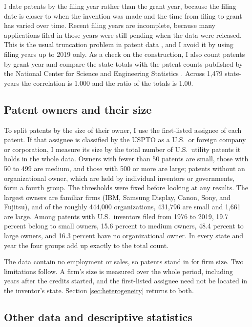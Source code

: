\documentclass[12pt]{article}
\begin{document}
I date patents by the filing year rather than the grant year, because the filing date is closer to when the
invention was made and the time from filing to grant has varied over time. Recent filing years are incomplete,
because many applications filed in those years were still pending when the data were released. This is the
usual truncation problem in patent data \citep{hall2001nber}, and I avoid it by using filing years up to 2019
only. As a check on the construction, I also count patents by grant year and compare the state totals with
the patent counts published by the National Center for Science and Engineering Statistics
\citep{ncses2026state}. Across 1,479 state-years the correlation is 1.000 and the ratio of the totals is 1.00.

\subsection{Patent owners and their size}

To split patents by the size of their owner, I use the first-listed assignee of each patent. If that assignee
is classified by the USPTO as a U.S.\ or foreign company or corporation, I measure its size by the total number
of U.S.\ utility patents it holds in the whole data. Owners with fewer than 50 patents are small, those with 50
to 499 are medium, and those with 500 or more are large; patents without an organizational owner, which are
held by individual inventors or governments, form a fourth group. The thresholds were fixed before looking at
any results. The largest owners are familiar firms (IBM, Samsung Display, Canon, Sony, and Fujitsu), and of the
roughly 444,000 organizations, 431,796 are small and 1,661 are large. Among patents with U.S.\ inventors filed
from 1976 to 2019, 19.7 percent belong to small owners, 15.6 percent to medium owners, 48.4 percent to large
owners, and 16.3 percent have no organizational owner. In every state and year the four groups add up exactly
to the total count.

The data contain no employment or sales, so patents stand in for firm size. Two limitations follow. A firm's
size is measured over the whole period, including years after the credits started, and the first-listed
assignee need not be located in the inventor's state. Section \ref{sec:heterogeneity} returns to both.

\subsection{Other data and descriptive statistics}
\end{document}
